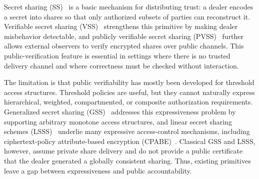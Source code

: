 \documentclass[runningheads]{llncs}
\newcommand{\gssrecon}{\mathsf{GSSRecon}}
\begin{document}

Secret sharing (SS)~\cite{Shamir79SS} is a basic mechanism for distributing trust: a dealer encodes a secret into shares so that only authorized subsets of parties can reconstruct it. Verifiable secret sharing (VSS)~\cite{Feldman1987VSS,Bagherpour2022VPSS,Alon1995VSS} strengthens this primitive by making dealer misbehavior detectable, and publicly verifiable secret sharing (PVSS)~\cite{Stadler1996PVSS,Cascudo2017PVSS,cascudo2024publicly} further allows external observers to verify encrypted shares over public channels. This public-verification feature is essential in settings where there is no trusted delivery channel and where correctness must be checked without interaction.

The limitation is that public verifiability has mostly been developed for threshold access structures. Threshold policies are useful, but they cannot naturally express hierarchical, weighted, compartmented, or composite authorization requirements. Generalized secret sharing (GSS)~\cite{Ito1987GSS,benaloh1990generalized,Beimel2025GSS} addresses this expressiveness problem by supporting arbitrary monotone access structures, and linear secret sharing schemes (LSSS)~\cite{Karchmer1993LSSS,Beimel2011LSSS,Beimel2025GSS} underlie many expressive access-control mechanisms, including ciphertext-policy attribute-based encryption (CPABE)~\cite{Bethencourt2007CPABE,Lewko2011DABE}. Classical GSS and LSSS, however, assume private share delivery and do not provide a public certificate that the dealer generated a globally consistent sharing. Thus, existing primitives leave a gap between expressiveness and public accountability.
\end{document}
